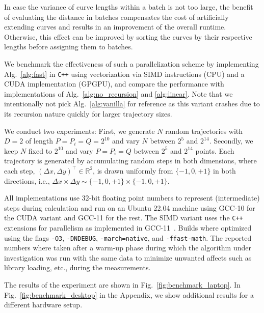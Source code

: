 In case the variance of curve lengths within a batch is not too large, the benefit of evaluating the distance in batches compensates the cost of artificially extending curves and results in an improvement of the overall runtime.
Otherwise, this effect can be improved by sorting the curves by their respective lengths before assigning them to batches.

We benchmark the effectiveness of such a parallelization scheme by implementing Alg.~\ref{alg:fast} in \texttt{C++} using vectorization via SIMD instructions (CPU) and a CUDA implementation (GPGPU), and compare the performance with implementations of Alg.~\ref{alg:no_recursion} and \ref{alg:linear}.
Note that we intentionally not pick Alg.~\ref{alg:vanilla} for reference as this variant crashes due to its recursion nature quickly for larger trajectory sizes.

We conduct two experiments:
First, we generate $N$ random trajectories with $D=2$ of length $P = P_i = Q = 2^{10}$ and vary $N$ between $2^5$ and $2^{14}$.
Secondly, we keep $N$ fixed to $2^{10}$ and vary $P = P_i = Q$ between $2^5$ and $2^{14}$ points.
Each trajectory is generated by accumulating random steps in both dimensions, where each step, $(\Delta x, \Delta y)^\top \in \mathbb{R}^2$, is drawn uniformly from $\{-1, 0, +1\}$ in both directions, i.e., $\Delta x \times \Delta y \sim \{ -1, 0, +1 \} \times \{ -1, 0, +1 \}$.

All implementations use 32-bit floating point numbers to represent (intermediate) steps during calculation and run on an Ubuntu 22.04 machine using GCC-10 for the CUDA variant and GCC-11 for the rest.
The SIMD variant uses the \texttt{C++} extensions for parallelism as implemented in GCC-11~\citep{N4808}.
Builds where optimized using the flags \texttt{-O3}, \texttt{-DNDEBUG}, \texttt{-march=native}, and \texttt{-ffast-math}.
The reported numbers where taken after a warm-up phase during which the algorithm under investigation was run with the same data to minimize unwanted affects such as library loading, etc., during the measurements.

The results of the experiment are shown in Fig.~\ref{fig:benchmark_laptop}.
In Fig.~\ref{fig:benchmark_desktop} in the Appendix, we show additional results for a different hardware setup.

